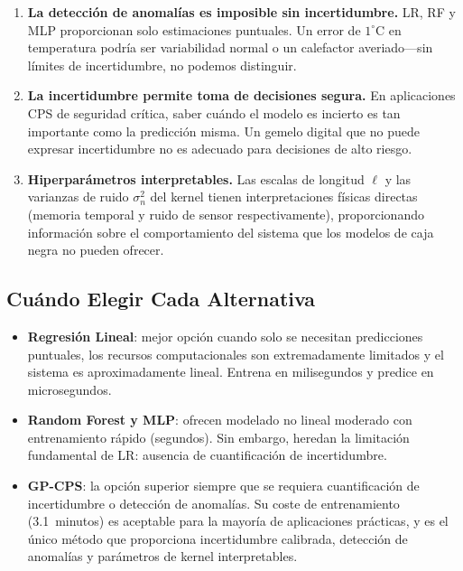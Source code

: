 \documentclass[conference]{IEEEtran}
\begin{document}
\begin{enumerate}
\item \textbf{La detección de anomalías es imposible sin incertidumbre.} LR, RF y MLP proporcionan solo estimaciones puntuales. Un error de $1^\circ$C en temperatura podría ser variabilidad normal o un calefactor averiado---sin límites de incertidumbre, no podemos distinguir.

\item \textbf{La incertidumbre permite toma de decisiones segura.} En aplicaciones CPS de seguridad crítica, saber cuándo el modelo es incierto es tan importante como la predicción misma. Un gemelo digital que no puede expresar incertidumbre no es adecuado para decisiones de alto riesgo.

\item \textbf{Hiperparámetros interpretables.} Las escalas de longitud $\ell$ y las varianzas de ruido $\sigma_n^2$ del kernel tienen interpretaciones físicas directas (memoria temporal y ruido de sensor respectivamente), proporcionando información sobre el comportamiento del sistema que los modelos de caja negra no pueden ofrecer.
\end{enumerate}

\subsection{Cuándo Elegir Cada Alternativa}
\begin{itemize}
\item \textbf{Regresión Lineal}: mejor opción cuando solo se necesitan predicciones puntuales, los recursos computacionales son extremadamente limitados y el sistema es aproximadamente lineal. Entrena en milisegundos y predice en microsegundos.

\item \textbf{Random Forest y MLP}: ofrecen modelado no lineal moderado con entrenamiento rápido (segundos). Sin embargo, heredan la limitación fundamental de LR: ausencia de cuantificación de incertidumbre.

\item \textbf{GP-CPS}: la opción superior siempre que se requiera cuantificación de incertidumbre o detección de anomalías. Su coste de entrenamiento (3.1~minutos) es aceptable para la mayoría de aplicaciones prácticas, y es el único método que proporciona incertidumbre calibrada, detección de anomalías y parámetros de kernel interpretables.
\end{itemize}
\end{document}
